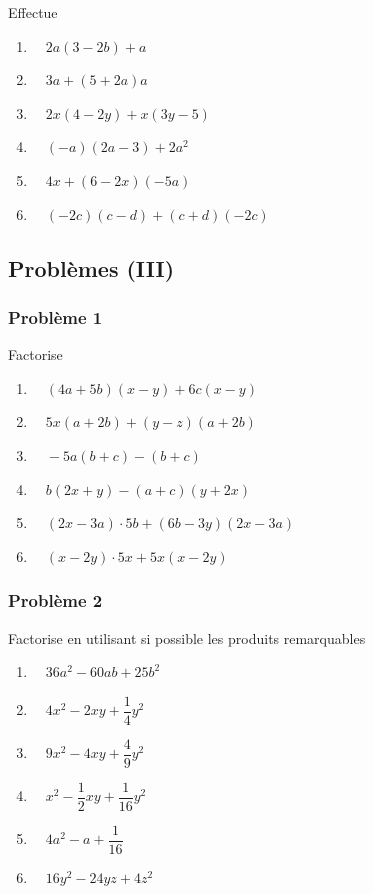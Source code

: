 \documentclass[
  12pt,
]{book}
\providecommand{\tightlist}{%
  \setlength{\itemsep}{0pt}\setlength{\parskip}{0pt}}
\begin{document}
Effectue

\begin{enumerate}
\def\labelenumi{\arabic{enumi}.}
\tightlist
\item
  \(\quad 2a(3-2b)+a\)
\item
  \(\quad 3a+(5+2a)a\)
\item
  \(\quad 2x(4-2y)+x(3y-5)\)
\item
  \(\quad (-a)(2a-3)+2a^2\)
\item
  \(\quad 4x+(6-2x)(-5a)\)
\item
  \(\quad (-2c)(c-d)+(c+d)(-2c)\)
\end{enumerate}

\hypertarget{probluxe8mes-iii-1}{%
\subsection{Problèmes (III)}\label{probluxe8mes-iii-1}}

\hypertarget{probluxe8me-1-1}{%
\subsubsection*{Problème 1}\label{probluxe8me-1-1}}

Factorise

\begin{enumerate}
\def\labelenumi{\arabic{enumi}.}
\tightlist
\item
  \(\quad (4a+5b)(x-y)+6c(x-y)\)
\item
  \(\quad 5x(a+2b)+(y-z)(a+2b)\)
\item
  \(\quad -5a(b+c)-(b+c)\)
\item
  \(\quad b(2x+y)-(a+c)(y+2x)\)
\item
  \(\quad (2x-3a)\cdot 5b+(6b-3y)(2x-3a)\)
\item
  \(\quad (x-2y)\cdot 5x+5x(x-2y)\)
\end{enumerate}

\hypertarget{probluxe8me-2-1}{%
\subsubsection*{Problème 2}\label{probluxe8me-2-1}}

Factorise en utilisant si possible les produits remarquables

\begin{enumerate}
\def\labelenumi{\arabic{enumi}.}
\tightlist
\item
  \(\quad 36a^2-60ab+25b^2\)
\item
  \(\quad 4x^2-2xy+\dfrac{1}{4}y^2\)
\item
  \(\quad 9x^2-4xy+\dfrac{4}{9}y^2\)
\item
  \(\quad x^2-\dfrac{1}{2}xy+\dfrac{1}{16}y^2\)
\item
  \(\quad 4a^2-a+\dfrac{1}{16}\)
\item
  \(\quad 16y^2-24yz+4z^2\)
\end{enumerate}
\end{document}
